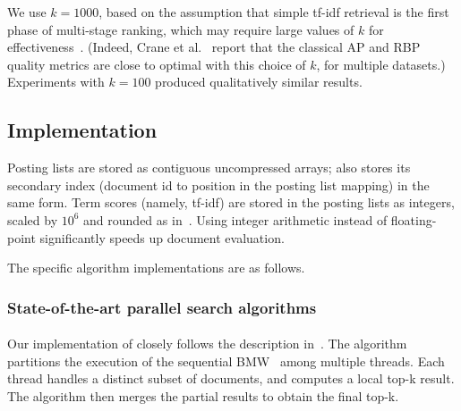 {We use  $k=1000$, {based on the assumption that simple tf-idf retrieval is the first phase of multi-stage ranking, 
which may require large values of $k$ for effectiveness~\cite{Wang:2011}. (Indeed, Crane et al.~\cite{Crane:2017} report
that the classical AP and RBP quality metrics are close to optimal with this choice of $k$, for multiple datasets.)}  
Experiments with $k=100$ produced qualitatively similar results.%


\subsection{Implementation}
\label{ssec:implementation}

Posting lists are stored as contiguous uncompressed arrays;  {\pRA} also stores 
its secondary index (document id to position in the posting list mapping) in the same form. 
Term scores (namely, tf-idf) are stored in the posting lists as integers, scaled by $10^6$ and rounded as in~\cite{Bortnikov:2017}. 
Using integer arithmetic instead of floating-point significantly speeds up document evaluation. 

The specific algorithm implementations are as follows.

\subsubsection{State-of-the-art parallel search algorithms}

\paragraph{\pBMW}
Our implementation of {\pBMW} closely follows the description in~\cite{rojas2013distributing}. The algorithm partitions the execution of the 
sequential BMW~\cite{Ding:2011} among multiple threads. Each thread handles a distinct subset of documents, and computes a local top-k 
result. The algorithm then merges the partial results to obtain the final top-k. 

}
